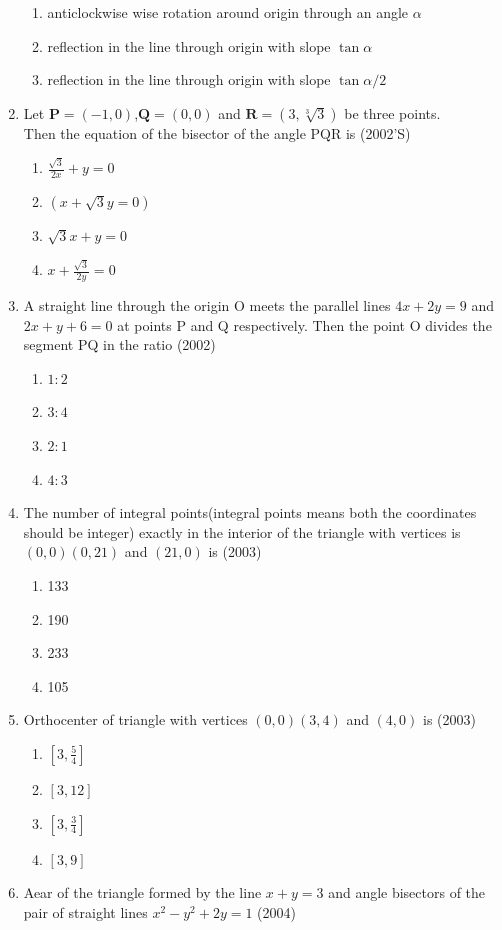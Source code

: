 \documentclass[12pt]{article}
\let\vec\mathbf
\begin{document}
\begin{enumerate}
\begin{enumerate}
\item anticlockwise wise rotation around origin through an angle $\alpha$
\item reflection in the line through origin with slope $\tan\alpha$
\item reflection in the line through origin with slope $\tan\alpha/2$
\end{enumerate}
\item Let $\vec{P}=(-1,0)$,$\vec{Q}=(0,0)$ and $\vec{R}=(3,\sqrt[3]{3})$ be three points.\\
Then the equation of the bisector of the angle PQR is (2002'S)
\begin{enumerate}
\item $\frac{\sqrt{3}}{2x}+y=0$ 
\item $(x+\sqrt{3}y=0)$
\item $\sqrt{3}x+y=0$ 
\item $x+\frac{\sqrt{3}}{2y}=0$
\end{enumerate}
\item A straight line through the origin O meets the parallel lines $4x+2y=9$ and $2x+y+6=0$ at points P and Q respectively. Then the point O divides the segment PQ in the ratio (2002)
\begin{enumerate}
\item $1:2$   
\item $3:4$
\item $2:1$ 
\item $4:3$ 
\end{enumerate}
\item The number of integral points(integral points means both the coordinates should be integer) exactly in the interior of the triangle with vertices is $(0,0)(0,21)$ and $(21,0)$ is (2003)
\begin{enumerate}
\item 133  
\item 190  
\item 233 
\item 105
\end{enumerate}
\item Orthocenter of triangle with vertices $(0,0)(3,4)$ and $(4,0)$ is  (2003)
\begin{enumerate}
\item $[3,\frac{5}{4}]$ 
\item $[3,12]$   
\item $[3,\frac{3}{4}]$ 
\item $[3,9]$
\end{enumerate}
\item Aear of the triangle formed by the line $x+y=3$ and angle bisectors of the pair of straight lines $x^2-y^2+2y=1$ (2004)

\end{enumerate}
\end{document}
